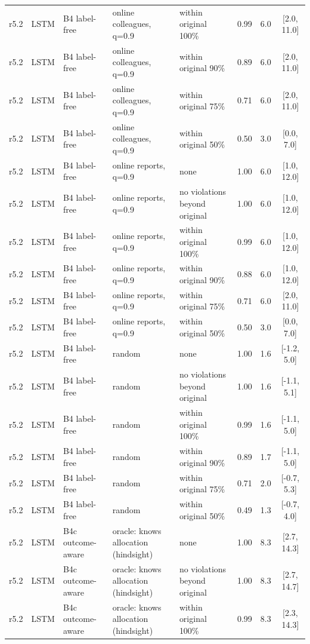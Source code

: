 \begin{longtable}{lllp{4.2cm}p{3.4cm}ccc}
r5.2 & LSTM & B4 label-free & online colleagues, q=0.9 & within original 100\% & 0.99 & 6.0 & [2.0, 11.0] \\
r5.2 & LSTM & B4 label-free & online colleagues, q=0.9 & within original 90\% & 0.89 & 6.0 & [2.0, 11.0] \\
r5.2 & LSTM & B4 label-free & online colleagues, q=0.9 & within original 75\% & 0.71 & 6.0 & [2.0, 11.0] \\
r5.2 & LSTM & B4 label-free & online colleagues, q=0.9 & within original 50\% & 0.50 & 3.0 & [0.0, 7.0] \\
r5.2 & LSTM & B4 label-free & online reports, q=0.9 & none & 1.00 & 6.0 & [1.0, 12.0] \\
r5.2 & LSTM & B4 label-free & online reports, q=0.9 & no violations beyond original & 1.00 & 6.0 & [1.0, 12.0] \\
r5.2 & LSTM & B4 label-free & online reports, q=0.9 & within original 100\% & 0.99 & 6.0 & [1.0, 12.0] \\
r5.2 & LSTM & B4 label-free & online reports, q=0.9 & within original 90\% & 0.88 & 6.0 & [1.0, 12.0] \\
r5.2 & LSTM & B4 label-free & online reports, q=0.9 & within original 75\% & 0.71 & 6.0 & [2.0, 11.0] \\
r5.2 & LSTM & B4 label-free & online reports, q=0.9 & within original 50\% & 0.50 & 3.0 & [0.0, 7.0] \\
r5.2 & LSTM & B4 label-free & random & none & 1.00 & 1.6 & [-1.2, 5.0] \\
r5.2 & LSTM & B4 label-free & random & no violations beyond original & 1.00 & 1.6 & [-1.1, 5.1] \\
r5.2 & LSTM & B4 label-free & random & within original 100\% & 0.99 & 1.6 & [-1.1, 5.0] \\
r5.2 & LSTM & B4 label-free & random & within original 90\% & 0.89 & 1.7 & [-1.1, 5.0] \\
r5.2 & LSTM & B4 label-free & random & within original 75\% & 0.71 & 2.0 & [-0.7, 5.3] \\
r5.2 & LSTM & B4 label-free & random & within original 50\% & 0.49 & 1.3 & [-0.7, 4.0] \\
r5.2 & LSTM & B4c outcome-aware & oracle: knows allocation (hindsight) & none & 1.00 & 8.3 & [2.7, 14.3] \\
r5.2 & LSTM & B4c outcome-aware & oracle: knows allocation (hindsight) & no violations beyond original & 1.00 & 8.3 & [2.7, 14.7] \\
r5.2 & LSTM & B4c outcome-aware & oracle: knows allocation (hindsight) & within original 100\% & 0.99 & 8.3 & [2.3, 14.3] \\

\end{longtable}
